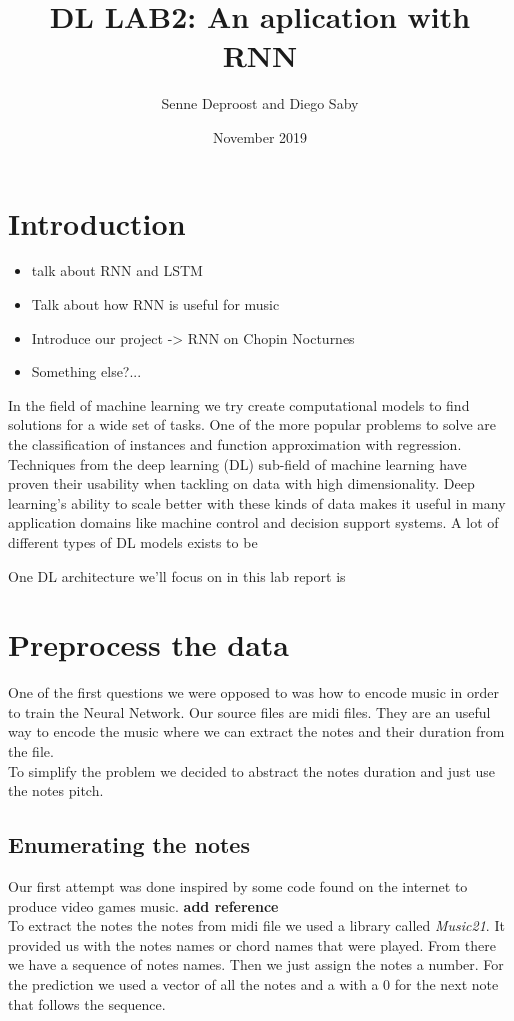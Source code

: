 \documentclass[11pt]
{article}
\title{DL LAB2: An aplication with RNN}
\author{Senne Deproost and Diego Saby}
\date{November 2019}
\begin{document}
\maketitle
\section{Introduction}

\begin{itemize}
	\item talk about RNN and LSTM
	\item Talk about how RNN is useful for music
	\item Introduce our project -> RNN on Chopin Nocturnes
	\item Something else?...
\end{itemize}

In the field of machine learning we try create computational models to find solutions for a wide set of tasks. One of the more popular problems to solve are the classification of instances and function approximation with regression. Techniques from the deep learning (DL) sub-field of machine learning have proven their usability when tackling on data with high dimen\-sionality. Deep learning's ability to scale better with these kinds of data makes it useful in many application domains like machine control and decision support systems. A lot of different types of DL models exists to be 

One DL architecture we'll focus on in this lab report is 

\section{Preprocess the data}
One of the first questions we were opposed to was how to encode music in order to train the Neural Network. Our source files are midi files. They are an useful way to encode the music where we can extract the notes and their duration from the file.\\
To simplify the problem we decided to abstract the notes duration and just use the notes pitch. \\
\subsection{Enumerating the notes}
Our first attempt was done inspired by some code found on the internet to produce video games music. \textbf{add reference}\\
To extract the notes the notes from midi file we used a library called \textit{Music21}. It provided us with the notes names or chord names that were played. From there we have a sequence of notes names. Then we just assign the notes a number.
For the prediction we used a vector of all the notes and a with a 0 for the next note that follows the sequence.
\end{document}

